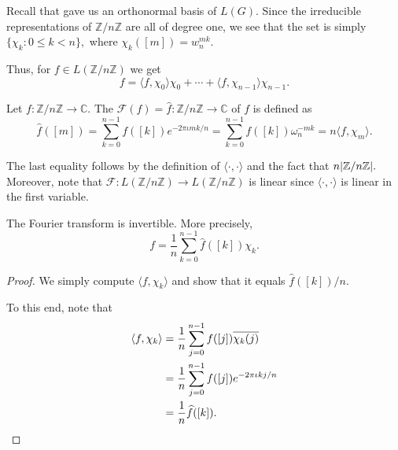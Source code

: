 \documentclass[12pt]{article}	%
\begin{document}
\begin{rem}
    Recall that  gave us an orthonormal basis of $L(G).$ Since the irreducible representations of $\mathbb{Z}/n\mathbb{Z}$ are all of degree one, we see that the set is simply $\{\chi_k : 0 \le k < n\},$ where $\chi_k([m]) = w_n^{mk}.$
    
    Thus, for $f \in L(\mathbb{Z}/n\mathbb{Z})$ we get 
    \begin{equation*}
        f = \langle f, \chi_0\rangle \chi_0 + \cdots + \langle f, \chi_{n - 1}\rangle \chi_{n - 1}.
    \end{equation*}
\end{rem}

\begin{defn} \label{defn:fourierZnZ}
    Let $f : \mathbb{Z}/n\mathbb{Z} \to \mathbb{C}.$ The  $\mathcal{F}(f) = \widehat{f} : \mathbb{Z}/n\mathbb{Z} \to \mathbb{C}$ of $f$ is defined as
    \begin{equation*}
        \widehat{f}([m]) = \sum_{k = 0}^{n - 1} f([k])e^{-2\pi\iota mk/n} = \sum_{k = 0}^{n - 1} f([k])\omega_n^{-mk} = n\langle f, \chi_m\rangle.
    \end{equation*}
\end{defn}

The last equality follows by the definition of $\langle \cdot , \cdot\rangle$ and the fact that $n {\left\lvert \mathbb{Z}/n\mathbb{Z} \right\lvert}.$ Moreover, note that $\mathcal{F} : L(\mathbb{Z}/n\mathbb{Z}) \to L(\mathbb{Z}/n\mathbb{Z})$ is linear since
$\langle \cdot , \cdot\rangle$ is linear in the first variable.

\begin{prop}
    The Fourier transform is invertible. More precisely, 
    \begin{equation*}
        f = \frac{1}{n}\sum_{k = 0}^{n - 1} \widehat{f}([k])\chi_k.
    \end{equation*}
\end{prop}
\begin{proof}
    We simply compute $\langle f, \chi_k\rangle$ and show that it equals $\widehat{f}([k])/n.$
    
    To this end, note that
    \begin{align*}
        \langle f, \chi_k\rangle &= \frac{1}{n} \sum_{j = 0}^{n - 1}f([j])\overline{\chi_k(j)} \\
        &= \frac{1}{n} \sum_{j = 0}^{n - 1}f([j])e^{-2\pi\iota kj/n} \\
        &= \frac{1}{n} \widehat{f}([k]). \qedhere
    \end{align*}
\end{proof}
\end{document}
